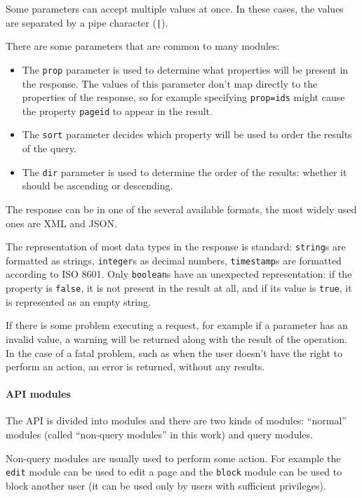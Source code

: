 Some parameters can accept multiple values at once.
In these cases, the values are separated by a pipe character (\texttt{|}).

There are some parameters that are common to many modules:

\begin{itemize}
\item The \texttt{prop} parameter is used to determine what properties will be present in the response.
The values of this parameter don't map directly to the properties of the response,
so for example specifying \texttt{prop=ids} might cause the property \texttt{pageid} to appear in the result.
\item The \texttt{sort} parameter decides which property will be used to order the results of the query.
\item The \texttt{dir} parameter is used to determine the order of the results:
whether it should be ascending or descending.
\end{itemize}

The response can be in one of the several available formats, the most widely used ones are \ac{XML} and \ac{JSON}.

The representation of most data types in the response is standard:
\texttt{string}s are formatted as strings, \texttt{integer}s as decimal numbers,
\texttt{timestamp}s are formatted according to ISO 8601.
Only \texttt{boolean}s have an unexpected representation:
if the property is \texttt{false}, it is not present in the result at all,
and if its value is \texttt{true}, it is represented as an empty string.

If there is some problem executing a request, for example if a parameter has an invalid value,
a warning will be returned along with the result of the operation.
In the case of a fatal problem, such as when the user doesn't have the right to perform an action,
an error is returned, without any results.

\paragraph{API modules}

The \ac{API} is divided into modules and there are two kinds of modules:
“normal” modules (called “non-query modules” in this work) and query modules.

Non-query modules are usually used to perform some action.
For example the \texttt{edit} module can be used to edit a page
and the \texttt{block} module can be used to block another user (it can be used only by users with sufficient privileges).

